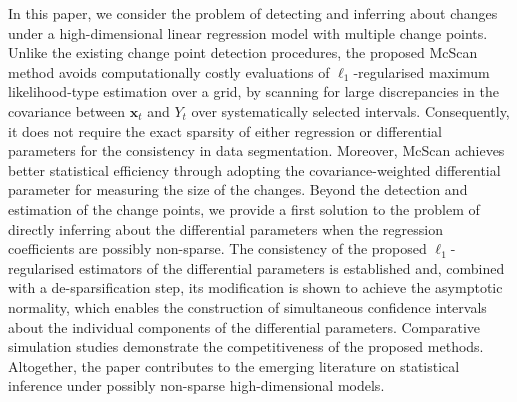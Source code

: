 \documentclass[11pt, a4paper]{article}
\newcommand{\mbf}{\mathbf}
\theoremstyle{definition}
\theoremstyle{definition}
\theoremstyle{definition}
\theoremstyle{definition}
\theoremstyle{definition}
\theoremstyle{remark}
\theoremstyle{definition}
\theoremstyle{definition}
\theoremstyle{definition}
\begin{document}
In this paper, we consider the problem of detecting and inferring about changes under a high-dimensional linear regression model with multiple change points.
Unlike the existing change point detection procedures, the proposed McScan method avoids computationally costly evaluations of $\ell_1$-regularised maximum likelihood-type estimation over a grid, by scanning for large discrepancies in the covariance between $\mbf x_t$ and $Y_t$ over systematically selected intervals.
Consequently, it does not require the {exact} sparsity of either regression or differential parameters for the consistency in data segmentation.
Moreover, McScan achieves better statistical efficiency through adopting the covariance-weighted differential parameter for measuring the size of the changes.
Beyond the detection and estimation of the change points, we provide a first solution to the problem of directly inferring about the differential parameters when the regression coefficients are possibly non-sparse.
The consistency of the proposed $\ell_1$-regularised estimators of the differential parameters is established and, combined with a de-sparsification step, its modification is shown to achieve the asymptotic normality, which enables the construction of simultaneous confidence intervals about the individual components of the differential parameters.
Comparative simulation studies demonstrate the competitiveness of the proposed methods.
Altogether, the paper contributes to the emerging literature on statistical inference under possibly non-sparse high-dimensional models.

%
%
%
\end{document}
